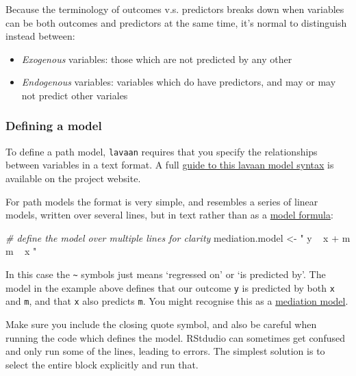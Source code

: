 \documentclass[]{article}
\newenvironment{Shaded}{\begin{snugshade}}{\end{snugshade}}
\newcommand{\CommentTok}[1]{\textcolor[rgb]{0.56,0.35,0.01}{\textit{#1}}}
\newcommand{\NormalTok}[1]{#1}
\newcommand{\StringTok}[1]{\textcolor[rgb]{0.31,0.60,0.02}{#1}}
\begin{document}
Because the terminology of outcomes v.s. predictors breaks down when variables
can be both outcomes and predictors at the same time, it's normal to distinguish
instead between:

\begin{itemize}
\item
  \emph{Exogenous} variables: those which are not predicted by any other
\item
  \emph{Endogenous} variables: variables which do have predictors, and may or may
  not predict other variales
\end{itemize}

\hypertarget{defining-a-model}{%
\subsubsection*{Defining a model}\label{defining-a-model}}

To define a path model, \texttt{lavaan} requires that you specify the relationships
between variables in a text format. A full
\href{http://lavaan.ugent.be/tutorial/syntax1.html}{guide to this lavaan model syntax}
is available on the project website.

For path models the format is very simple, and resembles a series of linear
models, written over several lines, but in text rather than as a
\protect\hyperlink{formulae}{model formula}:

\begin{Shaded}
\begin{Highlighting}[]
\CommentTok{# define the model over multiple lines for clarity}
\NormalTok{mediation.model <-}\StringTok{ "}
\StringTok{  y ~ x + m}
\StringTok{  m ~ x}
\StringTok{"}
\end{Highlighting}
\end{Shaded}

In this case the \texttt{\textasciitilde{}} symbols just means `regressed on' or `is predicted by'. The
model in the example above defines that our outcome \texttt{y} is predicted by both \texttt{x}
and \texttt{m}, and that \texttt{x} also predicts \texttt{m}. You might recognise this as a
\protect\hyperlink{mediation}{mediation model}.

{Make sure you include the closing quote symbol, and also be careful when
running the code which defines the model. RStdudio can sometimes get confused
and only run some of the lines, leading to errors. The simplest solution is to
select the entire block explicitly and run that.}
\end{document}
